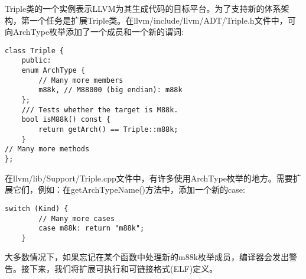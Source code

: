 Triple类的一个实例表示LLVM为其生成代码的目标平台。为了支持新的体系架构，第一个任务是扩展Triple类。在llvm/include/llvm/ADT/Triple.h文件中，可向ArchType枚举添加了一个成员和一个新的谓词:\par

\begin{lstlisting}[caption={}]
class Triple {
	public:
	enum ArchType {
		// Many more members
		m88k, // M88000 (big endian): m88k
	};
	/// Tests whether the target is M88k.
	bool isM88k() const {
		return getArch() == Triple::m88k;
	}
// Many more methods
};
\end{lstlisting}

在llvm/lib/Support/Triple.cpp文件中，有许多使用ArchType枚举的地方。需要扩展它们，例如：在getArchTypeName()方法中，添加一个新的case:\par

\begin{lstlisting}[caption={}]
	switch (Kind) {
		// Many more cases
		case m88k: return "m88k";
	}
\end{lstlisting}

大多数情况下，如果忘记在某个函数中处理新的m88k枚举成员，编译器会发出警告。接下来，我们将扩展可执行和可链接格式(ELF)定义。\par





































